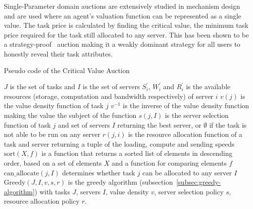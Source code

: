 Single-Parameter domain auctions are extensively studied in mechanism design~\cite{nisan2007algorithmic_228} and are
used where an agent's valuation function can be represented as a single value. The task price is calculated by finding
the critical value, the minimum task price required for the task still allocated to any server. This has
been shown to be a strategy-proof~\cite{nisan2007algorithmic_229_230} auction making it a weakly dominant strategy for
all users to honestly reveal their task attributes.

\begin{algorithm}
    \caption{Pseudo code of the Critical Value Auction}
    \label{alg:critical-value-auction}
    \begin{algorithmic}
        \REQUIRE $J$ is the set of tasks and $I$ is the set of servers
        \REQUIRE $S^{'}_i$, $W^{'}_i$ and $R^{'}_i$ is the available resources
            (storage, computation and bandwidth respectively) of server $i$
        \REQUIRE $v(j)$ is the value density function of task $j$
        \REQUIRE $v^{-1}$ is the inverse of the value density function making the value the subject of the function
        \REQUIRE $s(j, I)$ is the server selection function of task $j$ and set of servers $I$ returning the best
            server, or $\emptyset$ if the task is not able to be run on any server
        \REQUIRE $r(j, i)$ is the resource allocation function of a task and server returning a tuple of the
            loading, compute and sending speeds
        \REQUIRE $\text{sort}(X, f)$ is a function that returns a sorted list of elements in descending order, based
            on a set of elements $X$ and a function for comparing elements $f$
        \REQUIRE $\text{can\_allocate}(j, I)$ determines whether task $j$ can be allocated to any server $I$
        \REQUIRE $\text{Greedy}(J, I, v, s, r)$ is the greedy algorithm (subsection~\ref{subsec:greedy-algorithm}) with
            tasks $J$, servers $I$, value density $v$, server selection policy $s$, resource allocation policy $r$.

                    \ENDIF
                    \ENDIF
                \ENDIF
            \ENDFOR
        \ENDFOR
    \end{algorithmic}
\end{algorithm}

